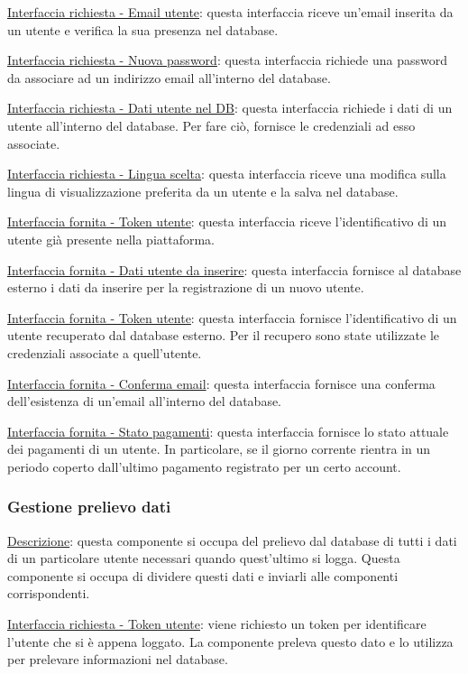 \documentclass[a4paper,12pt]{article}
\begin{document}
\underline{Interfaccia richiesta - Email utente}: questa interfaccia riceve un’email inserita da un utente e verifica la sua presenza nel database.

\underline{Interfaccia richiesta - Nuova password}: questa interfaccia richiede una password da associare ad un indirizzo email all’interno del database.

\underline{Interfaccia richiesta - Dati utente nel DB}: questa interfaccia richiede i dati di un utente all’interno del database. Per fare ciò, fornisce le credenziali ad esso associate.

\underline{Interfaccia richiesta - Lingua scelta}: questa interfaccia riceve una modifica sulla lingua di visualizzazione preferita da un utente e la salva nel database.

\underline{Interfaccia fornita - Token utente}: questa interfaccia riceve l’identificativo di un utente già presente nella piattaforma.

\underline{Interfaccia fornita - Dati utente da inserire}: questa interfaccia fornisce al database esterno i dati da inserire per la registrazione di un nuovo utente.

\underline{Interfaccia fornita - Token utente}: questa interfaccia fornisce l’identificativo di un utente recuperato dal database esterno. Per il recupero sono state utilizzate le credenziali associate a quell’utente.

\underline{Interfaccia fornita - Conferma email}: questa interfaccia fornisce una conferma dell’esistenza di un’email all’interno del database.

\underline{Interfaccia fornita - Stato pagamenti}: questa interfaccia fornisce lo stato attuale dei pagamenti di un utente. In particolare, se il giorno corrente rientra in un periodo coperto dall’ultimo pagamento registrato per un certo account.


\subsubsection{Gestione prelievo dati}

\underline{Descrizione}: questa componente si occupa del prelievo dal database di tutti i dati di un particolare utente necessari quando quest’ultimo si logga. Questa componente si occupa di dividere questi dati e inviarli alle componenti corrispondenti.

\underline{Interfaccia richiesta - Token utente}: viene richiesto un token per identificare l’utente che si è appena loggato.  La componente preleva questo dato e lo utilizza per prelevare informazioni nel database.
\end{document}

